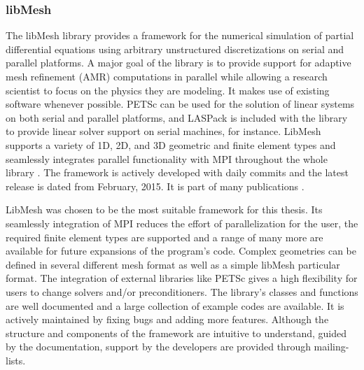   
  
  
  \subsubsection{libMesh}\cite{kirk2006libmesh}
  The libMesh library provides a framework for the numerical simulation of partial differential equations using arbitrary unstructured discretizations on serial and parallel platforms. A major goal of the library is to provide support for adaptive mesh refinement (AMR) computations in parallel while allowing a research scientist to focus on the physics they are modeling. It makes use of existing software whenever possible. PETSc can be used for the solution of linear systems on both serial and parallel platforms, and LASPack is included with the library to provide linear solver support on serial machines, for instance. LibMesh supports a variety of 1D, 2D, and 3D geometric and finite element types and seamlessly integrates parallel functionality with MPI throughout the whole library \cite{kirk2006libmesh}. The framework is actively developed with daily commits and the latest release is dated from February, 2015. It is part of many publications \cite{libmeshPubs}.
  
  LibMesh was chosen to be the most suitable framework for this thesis. Its seamlessly integration of MPI reduces the effort of parallelization for the user, the required finite element types are supported and a range of many more are available for future expansions of the program's code. Complex geometries can be defined in several different mesh format as well as a simple libMesh particular format. The integration of external libraries like PETSc gives a high flexibility for users to change solvers and/or preconditioners. The library's classes and functions are well documented and a large collection of example codes are available. It is actively maintained by fixing bugs and adding more features. Although the structure and components of the framework are intuitive to understand, guided by the documentation, support by the developers are provided through mailing-lists.
  
\newpage